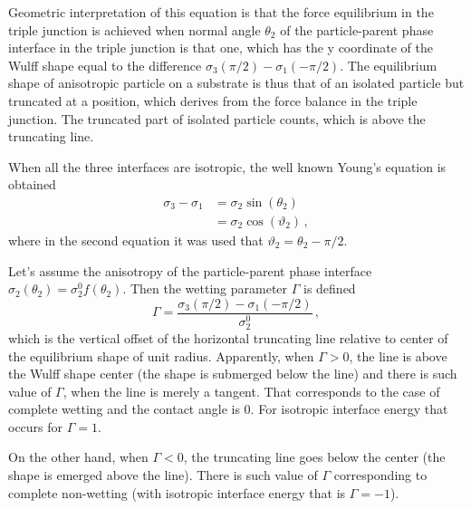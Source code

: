 Geometric interpretation of this equation is that the force equilibrium in the triple junction is achieved when normal angle $\theta_2$ of the particle-parent phase interface in the triple junction is that one, which has the y coordinate of the Wulff shape equal to the difference $\sigma_{3}(\pi/2)-\sigma_1(-\pi/2) $. The equilibrium shape of anisotropic particle on a substrate is thus that of an isolated particle but truncated at a position, which derives from the force balance in the triple junction. The truncated part of isolated particle counts, which is above the truncating line.

When all the three interfaces are isotropic, the well known Young's equation is obtained
\begin{align}
    \sigma_3-\sigma_1 &= \sigma_2\sin(\theta_2) \\
        &= \sigma_2\cos(\vartheta_2)
    \,,
\end{align}
where in the second equation it was used that $\vartheta_2=\theta_2-\pi/2$.

Let's assume the anisotropy of the particle-parent phase interface $\sigma_2(\theta_2)=\sigma_2^0f(\theta_2)$. Then the wetting parameter $\Gamma$ is defined
\begin{equation}
    \Gamma = \frac{\sigma_{3}(\pi/2)-\sigma_1(-\pi/2) }{\sigma_2^0} \,,
\end{equation}
which is the vertical offset of the horizontal truncating line relative to center of the equilibrium shape of unit radius. Apparently, when $\Gamma > 0$, the line is above the Wulff shape center (the shape is submerged below the line) and there is such value of $\Gamma$, when the line is merely a tangent. That corresponds to the case of complete wetting and the contact angle is 0. For isotropic interface energy that occurs for $\Gamma=1$.

On the other hand, when $\Gamma < 0$, the truncating line goes below the center (the shape is emerged above the line). There is such value of $\Gamma$ corresponding to complete non-wetting (with isotropic interface energy that is $\Gamma=-1$).


